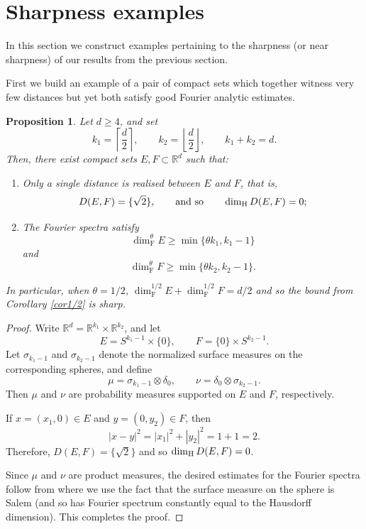 \documentclass[11pt]{amsart}
\numberwithin{equation}{section}
\renewcommand{\ge}{\geqslant}
\renewcommand{\geq}{\geqslant}
\newcommand{\hd}{\dim_{\textup{H}}}
\newcommand{\fs}{\dim^\theta_{\mathrm{F}}}
\newtheorem{proposition}[theorem]{Proposition}
\theoremstyle{plain}
\theoremstyle{remark}
\newcommand{\R}{\mathbb{R}}
\begin{document}
 
 
 


\section{Sharpness examples} \label{sec:examples}

In this section we construct examples pertaining to the sharpness (or near sharpness) of our results from the previous section.  

First we build an example of a pair of compact sets which together witness very few distances but yet both satisfy good Fourier analytic estimates.

\begin{proposition}\label{ex1}
Let $d\ge 4$, and set
\[
k_1=\left\lceil \frac d2\right\rceil,
\qquad
k_2=\left\lfloor \frac d2\right\rfloor,
\qquad
k_1+k_2=d.
\]
Then, there exist compact sets $E,F\subset\R^d$ such that:
\begin{enumerate}[label=\textup{(\roman*)},itemsep=2pt]
\item
Only a single distance is realised between $E$ and $F$, that is,
\[
D(E,F)=\{\sqrt 2\},
\qquad\text{and so}\qquad
\hd D(E,F)=0;
\]
\item The Fourier spectra satisfy
\[
\fs E   \geq \min\{\theta k_1,  k_1-1\}  
\]
and
\[
\fs F   \geq \min\{\theta k_2,  k_2-1\}.
\]
\end{enumerate}
In particular, when $\theta=1/2$, $\dim_\mathrm{F}^{1/2} E + \dim_\mathrm{F}^{1/2} F = d/2$ and so the bound from Corollary \ref{cor1/2} is sharp.
\end{proposition}

\begin{proof}
Write $\R^d=\R^{k_1}\times\R^{k_2}$, and let
\[
E=S^{k_1-1}\times\{0\},
\qquad
F=\{0\}\times S^{k_2-1}.
\]
Let $\sigma_{k_1-1}$ and $\sigma_{k_2-1}$ denote the normalized surface measures on the corresponding spheres, and define
\[
\mu=\sigma_{k_1-1}\otimes\delta_0,
\qquad
\nu=\delta_0\otimes\sigma_{k_2-1}.
\]
Then $\mu$ and $\nu$ are probability measures supported on $E$ and $F$, respectively.

If $x=(x_1,0)\in E$ and $y=(0,y_2)\in F$, then
\[
|x-y|^2=|x_1|^2+|y_2|^2=1+1=2.
\]
Therefore, $D(E,F)=\{\sqrt 2\}$ and so $\hd D(E,F)=0$.

Since $\mu$ and $\nu$ are product measures, the desired estimates for the Fourier spectra follow from \cite[Theorem 2.1]{JMF2}  where we use  the fact that the surface measure on the sphere is Salem (and so has Fourier spectrum constantly equal to the Hausdorff dimension). This completes the proof.
\end{proof}
\end{document}
